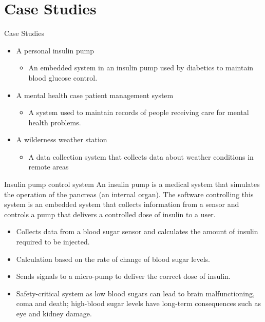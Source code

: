 \documentclass{beamer}
\begin{document}
\section{Case Studies}
\begin{frame}{Case Studies}
	\begin{itemize}
		\item A personal insulin pump
		\begin{itemize}
			\item An embedded system in an insulin pump used by diabetics to maintain blood glucose control.
		\end{itemize}
		\item A mental health case patient management system
		\begin{itemize}
			\item A system used to maintain records of people receiving care for mental health problems.
		\end{itemize}
		\item A wilderness weather station
	   \begin{itemize}
	   	\item 	A data collection system that collects data about weather conditions in remote areas
	   \end{itemize}
	\end{itemize}
\end{frame}
\begin{frame}{Insulin pump control system}
	An insulin pump is a medical system that simulates the operation of the pancreas (an 
	internal organ). The software controlling this system is an embedded system that 
	collects information from a sensor and controls a pump that delivers a controlled 
	dose of insulin to a user.
\begin{itemize}
	\item Collects data from a blood sugar sensor and calculates the amount of insulin required to be injected.
	\item Calculation based on the rate of change of blood sugar levels.
	\item Sends signals to a micro-pump to deliver the correct dose of insulin.
	\item Safety-critical system as low blood sugars can lead to brain malfunctioning, coma and death; high-blood sugar levels have long-term consequences such as eye and kidney damage.
	
\end{itemize}
\end{frame}
\end{document}

